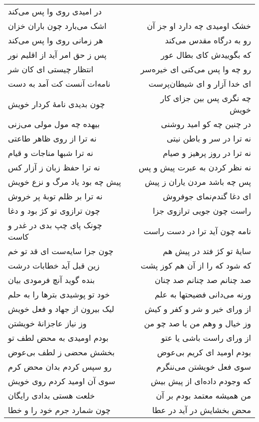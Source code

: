 \begin{center}
\begin{longtable}{l p{0.5cm} r}
در امیدی روی وا پس می‌کند
\\
اشک می‌بارد چون باران خزان
&&
خشک اومیدی چه دارد او جز آن
\\
هر زمانی روی وا پس می‌کند
&&
رو به درگاه مقدس می‌کند
\\
پس ز حق امر آید از اقلیم نور
&&
که بگوییدش کای بطال عور
\\
انتظار چیستی ای کان شر
&&
رو چه وا پس می‌کنی ای خیره‌سر
\\
نامه‌ات آنست کت آمد به دست
&&
ای خدا آزار و ای شیطان‌پرست
\\
چون بدیدی نامهٔ کردار خویش
&&
چه نگری پس بین جزای کار خویش
\\
بیهده چه مول مولی می‌زنی
&&
در چنین چه کو امید روشنی
\\
نه ترا از روی ظاهر طاعتی
&&
نه ترا در سر و باطن نیتی
\\
نه ترا شبها مناجات و قیام
&&
نه ترا در روز پرهیز و صیام
\\
نه ترا حفظ زبان ز آزار کس
&&
نه نظر کردن به عبرت پیش و پس
\\
پیش چه بود یاد مرگ و نزع خویش
&&
پس چه باشد مردن یاران ز پیش
\\
نه ترا بر ظلم توبهٔ پر خروش
&&
ای دغا گندم‌نمای جوفروش
\\
چون ترازوی تو کژ بود و دغا
&&
راست چون جویی ترازوی جزا
\\
چونک پای چپ بدی در غدر و کاست
&&
نامه چون آید ترا در دست راست
\\
چون جزا سایه‌ست ای قد تو خم
&&
سایهٔ تو کژ فتد در پیش هم
\\
زین قبل آید خطابات درشت
&&
که شود که را از آن هم کوز پشت
\\
بنده گوید آنچ فرمودی بیان
&&
صد چنانم صد چنانم صد چنان
\\
خود تو پوشیدی بترها را به حلم
&&
ورنه می‌دانی فضیحتها به علم
\\
لیک بیرون از جهاد و فعل خویش
&&
از ورای خیر و شر و کفر و کیش
\\
وز نیاز عاجزانهٔ خویشتن
&&
وز خیال و وهم من یا صد چو من
\\
بودم اومیدی به محض لطف تو
&&
از ورای راست باشی یا عتو
\\
بخشش محضی ز لطف بی‌عوض
&&
بودم اومید ای کریم بی‌عوض
\\
رو سپس کردم بدان محض کرم
&&
سوی فعل خویشتن می‌ننگرم
\\
سوی آن اومید کردم روی خویش
&&
که وجودم داده‌ای از پیش بیش
\\
خلعت هستی بدادی رایگان
&&
من همیشه معتمد بودم بر آن
\\
چون شمارد جرم خود را و خطا
&&
محض بخشایش در آید در عطا

\end{longtable}
\end{center}
